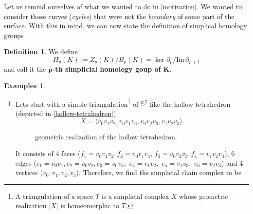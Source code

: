 \documentclass[draft]{scrartcl}
\theoremstyle{plain}
\theoremstyle{definition}
\newtheorem	{definition}[theorem]{Definition}
\newtheorem{examples}[theorem]{Examples}
\theoremstyle{remark}
\newcommand{\Z}{\mathbb{Z}}
\newcommand{\Sp}{\mathbb{S}}
\newcommand{\im}{\mathrm{Im}\,}
\begin{document}
Let us remind ourselves of what we wanted to do in \autoref{motivation}. We wanted to consider those curves (\emph{cycles}) that were not the \emph{boundary} of some part of the surface. With this in mind, we can now state the definition of simplical homology groups

\begin{definition}
	We define \[
	H_p(K):=Z_p(K)/B_p(K)=\ker \partial_p/\im \partial_{p+1}
	\]
	and call it the \textbf{$\mathbf{p}$-th simplicial homology goup of $\mathbf{K}$}.
\end{definition}

\begin{examples}\mbox{}
	\begin{enumerate}
		\item Lets start with a simple triangulation\footnote{A triangulation of a space $T$ is a simplicial complex $X$ whose geometric realization $|X|$ is homeomorphic to $T$.}
		 of $\Sp^2$ like the hollow tetrahedron (depicted in \autoref{hollow-tetrahedron}) \[X=\langle v_0v_1v_2,v_0v_1v_3,v_0v_2v_3,v_1v_2v_3 \rangle. \]
			 	
		 	\begin{figure}\centering
		 		\caption{geometric realization of the hollow tetrahedron.\label{hollow-tetrahedron}}
		 	\end{figure}
	 It consists of 4 faces ($f_1=v_0v_1v_2, f_2=v_0v_1v_3$, $f_3=v_0v_2v_3, f_4=v_1v_2v_3$), 6 edges ($e_1=v_0v_1, e_2=v_0v_2, e_3=v_0v_3,$ $ e_4=v_1v_2, $ $e_5=v_1v_3, $ $e_6=v_2v_3$) and 4 vertices ($v_0,v_1,v_2,v_3$). Therefore, we find the simplicial chain complex to be
 

\end{enumerate}
\end{examples}
\end{document}

